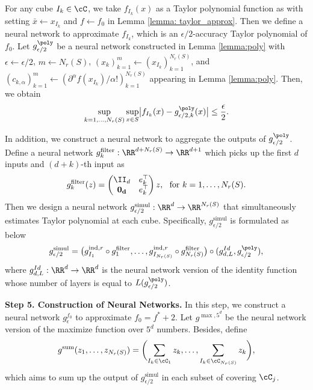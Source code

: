 For any cube $I_k \in \cC$, we take $f_{I_k}(x)$ as a Taylor polynomial function as with setting $\bar{x} \leftarrow x_{I_k}$ and $f \leftarrow f_0$ in Lemma \ref{lemma: taylor_approx}. Then we define a neural network to approximate $f_{I_k}$, which is an $\epsilon/2$-accuracy Taylor polynomial of $f_0$. Let $g^{\poly}_{\epsilon/2}$ be a neural network constructed in Lemma \ref{lemma:poly} with $\epsilon \leftarrow \epsilon/2$, $m \leftarrow N_r(S)$, $(x_k)_{k=1}^{m} \leftarrow (x_{I_k})_{k=1}^{N_r(S)}$, and
$(c_{k, \alpha})_{k=1}^{m} \leftarrow (\partial^\alpha f(x_{I_k})/\alpha!)_{k=1}^{N_r(S)}$ appearing in Lemma \ref{lemma:poly}.
Then, we obtain
\begin{align}
  \sup_{k=1,\dots,N_r(S)} \sup_{x \in S} \bigl| f_{I_k}(x) - g^{\poly}_{\epsilon/2,k}(x) \bigr| \leq \frac{\epsilon}{2}. \label{eq:poly}
\end{align}

In addition, we construct a neural network to aggregate the outputs of $g^{\poly}_{\epsilon/2}$. Define a neural network $g^{\text{filter}}_k : \RR^{d + N_r(S)} \to \RR^{d+1}$ which picks up the first $d$ inputs and $(d + k)$-th input as
\begin{equation*}
    g^{\text{filter}}_k (z)= \begin{pmatrix}\II_d & e_k^\top \\ \bf{0}_d & e_k^\top \end{pmatrix}z,~\text{ for } k=1,\dots,N_r(S).
\end{equation*}
Then we design a neural network $g^{\text{simul}}_{\epsilon/2}: \RR^d \to \RR^{N_r(S)}$ that simultaneously estimates Taylor polynomial at each cube. Specifically, $g^{\text{simul}}_{\epsilon/2}$ is formulated as below  
\begin{equation}\label{eq:simul}
\begin{split}
    g^{\text{simul}}_{\epsilon/2} = \bigl(g_{I_1}^{\text{ind},r}\circ g^{\text{filter}}_1 ,\ldots,g_{I_{ N_r(S)}}^{\text{ind},r}
    \circ g^{\text{filter}}_{ N_r(S)} \bigr) \circ (g^{Id}_{d,L},  g^{\poly}_{\epsilon/2}),
\end{split}
\end{equation}
where $g^{Id}_{d,L}: \RR^d \to \RR^d$ is the neural network version of the identity function whose number of layers is equal to $L(g^{\poly}_{\epsilon/2})$.


\textbf{Step 5. Construction of Neural Networks.} 
In this step, we construct a neural network $g^{f_0}_\epsilon$ to approximate $f_0 = f^* + 2 $. Let $g^{\max,5^d}$ be the neural network version of the maximize function over $5^d$ numbers. Besides, define
\begin{equation*}
    g^{\text{sum}}(z_1, \dots, z_{N_r(S)}) = \biggl( \sum_{I_k \in \cC_1} z_k, \dots,  \sum_{I_k \in \cC_{N_r(S)}} z_k \biggr),
\end{equation*}
which aims to sum up the output of $g^{\text{simul}}_{\epsilon/2}$ in each subset of covering $\cC_j$. 

